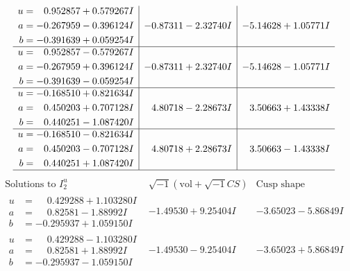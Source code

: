\documentclass[1p]{elsarticle_modified}
\theoremstyle{definition}
\newcommand{\I}{\sqrt{-1}}
\begin{document}
$$\begin{array}{c|c|c}
\begin{aligned}
u &= \phantom{-}0.952857 + 0.579267 I \\
a &= -0.267959 - 0.396124 I \\
b &= -0.391639 + 0.059254 I\end{aligned}
 & -0.87311 - 2.32740 I & -5.14628 + 1.05771 I \\ \hline\begin{aligned}
u &= \phantom{-}0.952857 - 0.579267 I \\
a &= -0.267959 + 0.396124 I \\
b &= -0.391639 - 0.059254 I\end{aligned}
 & -0.87311 + 2.32740 I & -5.14628 - 1.05771 I \\ \hline\begin{aligned}
u &= -0.168510 + 0.821634 I \\
a &= \phantom{-}0.450203 + 0.707128 I \\
b &= \phantom{-}0.440251 - 1.087420 I\end{aligned}
 & \phantom{-}4.80718 - 2.28673 I & \phantom{-}3.50663 + 1.43338 I \\ \hline\begin{aligned}
u &= -0.168510 - 0.821634 I \\
a &= \phantom{-}0.450203 - 0.707128 I \\
b &= \phantom{-}0.440251 + 1.087420 I\end{aligned}
 & \phantom{-}4.80718 + 2.28673 I & \phantom{-}3.50663 - 1.43338 I\\
 \hline 
 \end{array}$$\newpage$$\begin{array}{c|c|c}  
\text{Solutions to }I^u_{2}& \I (\text{vol} + \sqrt{-1}CS) & \text{Cusp shape}\\
 \hline 
\begin{aligned}
u &= \phantom{-}0.429288 + 1.103280 I \\
a &= \phantom{-}0.82581 - 1.88992 I \\
b &= -0.295937 + 1.059150 I\end{aligned}
 & -1.49530 + 9.25404 I & -3.65023 - 5.86849 I \\ \hline\begin{aligned}
u &= \phantom{-}0.429288 - 1.103280 I \\
a &= \phantom{-}0.82581 + 1.88992 I \\
b &= -0.295937 - 1.059150 I\end{aligned}
 & -1.49530 - 9.25404 I & -3.65023 + 5.86849 I \\ \hline\begin{aligned}

\end{aligned}
\end{array}$$
\end{document}
